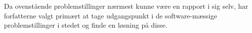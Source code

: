 Da ovenstående problemstillinger nærmest kunne være en rapport i sig selv, har forfatterne valgt primært at tage udgangspunkt i de software-mæssige problemstillinger i stedet og finde en løsning på disse.

